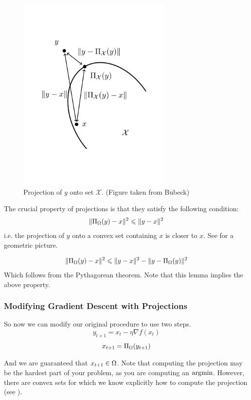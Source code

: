 \begin{figure}
\begin{center}
\includegraphics[width=3in]{figures/lecture2-projection}
\end{center}
\caption{Projection of $y$ onto set $\mathcal{X}$. (Figure taken from Bubeck) }
\end{figure}

The crucial property of projections is that they satisfy the following condition:
\[
\| \Pi_{\Omega}(y) - x \|^2 \leqslant \| y - x \|^2
\]
i.e. the projection of $y$ onto a convex set containing $x$ is closer to $x$. See  for a geometric picture.

\begin{lemma}
\[
\| \Pi_{\Omega}(y) - x \|^2 \leqslant \| y - x \|^2 - \| y - \Pi_{\Omega}(y) \|^2
\]
Which follows from the Pythagorean theorem. Note that this lemma implies the above property.
\end{lemma}

\subsubsection{Modifying Gradient Descent with Projections}

So now we can modify our original procedure to use two steps.
\[
y_{t+1} = x_t - \eta \nabla f(x_t)
\]
\[
x_{t+1} = \Pi_{\Omega}(y_{t+1})
\]

And we are guaranteed that $x_{t+1}\in\Omega$. Note that computing the projection may be the hardest part of your problem, as you are computing an $\operatorname*{\arg\!\min}$. However, there are convex sets for which we know explicitly how to compute the projection (see ).

